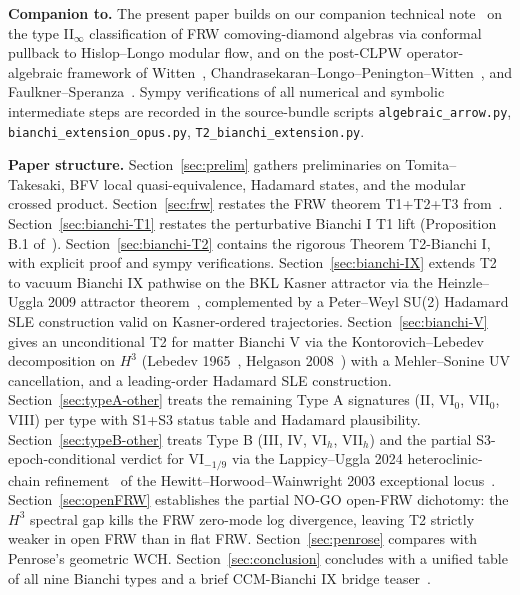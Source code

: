 \documentclass[11pt]{article}
\theoremstyle{definition}
\begin{document}
\medskip

\noindent\textbf{Companion to.} The present paper builds on our companion technical note~\cite{frw_note} on the type II$_\infty$ classification of FRW comoving-diamond algebras via conformal pullback to Hislop--Longo modular flow, and on the post-CLPW operator-algebraic framework of Witten~\cite{Witten2022}, Chandrasekaran--Longo--Penington--Witten~\cite{CLPW2023}, and Faulkner--Speranza~\cite{FaulknerSperanza2024}. Sympy verifications of all numerical and symbolic intermediate steps are recorded in the source-bundle scripts \texttt{algebraic\_arrow.py}, \texttt{bianchi\_extension\_opus.py}, \texttt{T2\_bianchi\_extension.py}.

\medskip

\noindent\textbf{Paper structure.} Section~\ref{sec:prelim} gathers preliminaries on Tomita--Takesaki, BFV local quasi-equivalence, Hadamard states, and the modular crossed product. Section~\ref{sec:frw} restates the FRW theorem T1+T2+T3 from~\cite{algebraic_arrow}. Section~\ref{sec:bianchi-T1} restates the perturbative Bianchi I T1 lift (Proposition B.1 of~\cite{bianchi_extension_opus}). Section~\ref{sec:bianchi-T2} contains the rigorous Theorem T2-Bianchi I, with explicit proof and sympy verifications. Section~\ref{sec:bianchi-IX} extends T2 to vacuum Bianchi IX pathwise on the BKL Kasner attractor via the Heinzle--Uggla 2009 attractor theorem~\cite{HeinzleUgglaAttractor2009}, complemented by a Peter--Weyl SU(2) Hadamard SLE construction valid on Kasner-ordered trajectories. Section~\ref{sec:bianchi-V} gives an unconditional T2 for matter Bianchi V via the Kontorovich--Lebedev decomposition on $H^3$ (Lebedev 1965~\cite{Lebedev1965}, Helgason 2008~\cite{Helgason2008}) with a Mehler--Sonine UV cancellation, and a leading-order Hadamard SLE construction. Section~\ref{sec:typeA-other} treats the remaining Type A signatures (II, VI$_0$, VII$_0$, VIII) per type with S1+S3 status table and Hadamard plausibility. Section~\ref{sec:typeB-other} treats Type B (III, IV, VI$_h$, VII$_h$) and the partial S3-epoch-conditional verdict for VI$_{-1/9}$ via the Lappicy--Uggla 2024 heteroclinic-chain refinement~\cite{LappicyUggla2024} of the Hewitt--Horwood--Wainwright 2003 exceptional locus~\cite{HewittHorwoodWainwright2003}. Section~\ref{sec:openFRW} establishes the partial NO-GO open-FRW dichotomy: the $H^3$ spectral gap kills the FRW zero-mode log divergence, leaving T2 strictly weaker in open FRW than in flat FRW. Section~\ref{sec:penrose} compares with Penrose's geometric WCH. Section~\ref{sec:conclusion} concludes with a unified table of all nine Bianchi types and a brief CCM-Bianchi IX bridge teaser~\cite{CCM_BIX_dictionary_max}.
\end{document}
